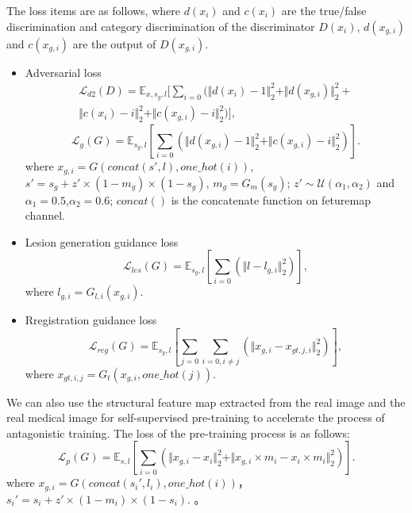\documentclass[runningheads]{llncs}
\begin{document}
The loss items are as follows, where $d(x_{i})$ and $c(x_{i})$ are the true/false discrimination and category discrimination of the discriminator $D(x_i)$, $d(x_{g, i})$ and $c(x_{g,i})$ are the output of $D(x_{g,i})$. 
\begin{itemize}
	\item{Adversarial loss}
	\begin{equation}
	\begin{split}
	\mathcal{L}_{d2}(D)=\mathbb{E}_{x,s_g,l}[\sum\limits_{i=0}(\Vert{d(x_i)-1}\Vert_{2}^{2}+\Vert{d(x_{g,i})}\Vert_{2}^{2}+\\
	\Vert{c(x_i)-i}\Vert_{2}^{2}+\Vert{c(x_{g,i})-i}\Vert_{2}^{2})],
	\end{split}
	\end{equation}
	\begin{equation}
	\mathcal{L}_{g}(G)=\mathbb{E}_{s_g,l}[\sum\limits_{i=0}(\Vert{d(x_{g,i})-1}\Vert_{2}^{2}+\Vert{c(x_{g,i})-i}\Vert_{2}^{2})].
	\end{equation}
	where $x_{g,i}=G(concat(s',l),one\_hot(i))$,
	$s'=s_g+z'\times(1-m_g)\times(1-s_g)$,
	$m_g=G_m(s_g)$;
	$z'\sim\mathcal{U}(\alpha_1,\alpha_2)$ and $\alpha_1=0.5$,$\alpha_2=0.6$;
	$concat()$ is the concatenate function on feturemap channel.
	\item{Lesion generation guidance loss}
	\begin{equation}
	\mathcal{L}_{les}(G)=\mathbb{E}_{s_g,l}[\sum\limits_{i=0}(\Vert{l-l_{g,i}}\Vert_{2}^{2})],
	\end{equation}
	where $l_{g,i}=G_{l,i}(x_{g,i})$.
	\item{Rregistration guidance loss}
	\begin{equation}
	\mathcal{L}_{reg}(G)=\mathbb{E}_{s_g,l}[\sum\limits_{j=0}\sum\limits_{i=0,i\neq j}(\Vert{x_{g,i}-x_{gt,j,i}}\Vert_{2}^{2})],
	\end{equation}
	where $x_{gt,i,j}=G_{t}(x_{g,i},one\_hot(j))$.
\end{itemize}

We can also use the structural feature map extracted from the real image and the real medical image for self-supervised pre-training to accelerate the process of antagonistic training. The loss of the pre-training process is as follows:
\begin{equation}
\mathcal{L}_{p}(G)=\mathbb{E}_{s,l}[\sum\limits_{i=0}(\Vert{x_{g,i}-x_i}\Vert_{2}^{2}+\Vert{x_{g,i}\times m_i-x_{i}\times m_i}\Vert_{2}^{2})].
\end{equation}
where $x_{g,i}=G(concat(s_i',l_i),one\_hot(i))$，$s_i'=s_i+z'\times(1-m_i)\times(1-s_i)$.
。
\end{document}
